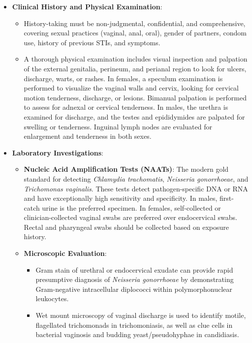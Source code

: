 \begin{itemize}
    \item \textbf{Clinical History and Physical Examination}:
    \begin{itemize}
        \item History-taking must be non-judgmental, confidential, and comprehensive, covering sexual practices (vaginal, anal, oral), gender of partners, condom use, history of previous STIs, and symptoms.
        \item A thorough physical examination includes visual inspection and palpation of the external genitalia, perineum, and perianal region to look for ulcers, discharge, warts, or rashes. In females, a speculum examination is performed to visualize the vaginal walls and cervix, looking for cervical motion tenderness, discharge, or lesions. Bimanual palpation is performed to assess for adnexal or cervical tenderness. In males, the urethra is examined for discharge, and the testes and epididymides are palpated for swelling or tenderness. Inguinal lymph nodes are evaluated for enlargement and tenderness in both sexes.
    \end{itemize}
    \item \textbf{Laboratory Investigations}:
    \begin{itemize}
        \item \textbf{Nucleic Acid Amplification Tests (NAATs)}: The modern gold standard for detecting \textit{Chlamydia trachomatis}, \textit{Neisseria gonorrhoeae}, and \textit{Trichomonas vaginalis}. These tests detect pathogen-specific DNA or RNA and have exceptionally high sensitivity and specificity. In males, first-catch urine is the preferred specimen. In females, self-collected or clinician-collected vaginal swabs are preferred over endocervical swabs. Rectal and pharyngeal swabs should be collected based on exposure history.
        \item \textbf{Microscopic Evaluation}:
        \begin{itemize}
            \item Gram stain of urethral or endocervical exudate can provide rapid presumptive diagnosis of \textit{Neisseria gonorrhoeae} by demonstrating Gram-negative intracellular diplococci within polymorphonuclear leukocytes.
            \item Wet mount microscopy of vaginal discharge is used to identify motile, flagellated trichomonads in trichomoniasis, as well as clue cells in bacterial vaginosis and budding yeast/pseudohyphae in candidiasis.

\end{itemize}
\end{itemize}
\end{itemize}
